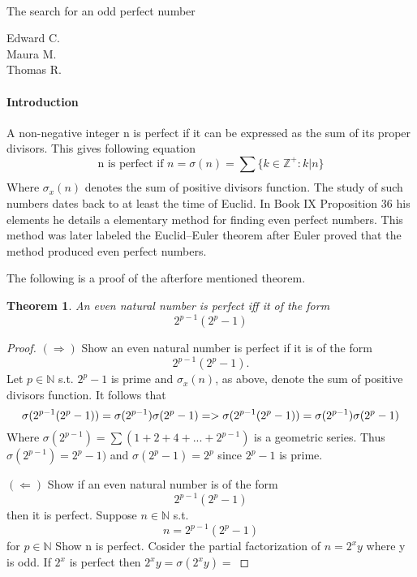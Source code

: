 \\\documentclass[12pt]{article}
\newtheorem{theorem}{Theorem}
\begin{document}
\begin{center}
	\Large
	The search for an odd perfect number
\end{center}

\begin{flushright}
	Edward C.\\
	\vspace{2 mm}
	Maura M.\\
	\vspace{2 mm}
	Thomas R.\\
\end{flushright}

\paragraph*{Introduction}
	A non-negative integer n is perfect if it can be expressed as the sum of its proper divisors. This gives following equation 
	$$\text{n is perfect if } n = \sigma(n) = \sum_{}{}\{k \in \mathbb{Z}^+ : k|n\}$$  Where $\sigma_x (n)$ 
	denotes the sum of positive divisors function.  The study of such numbers dates back to at least the 
	time of Euclid. In Book IX Proposition 36 his elements he details a elementary method for finding even
	perfect numbers.  This method was later labeled the Euclid–Euler theorem
	after Euler proved that the method produced even perfect numbers.
	
	The following is a proof of the afterfore mentioned theorem.
	
	\begin{theorem}
		An even natural number is perfect iff it of the form $$2^{p-1} (2^{p} - 1)$$
	\end{theorem}
	
	\begin{proof}
		$(\Rightarrow)$
			Show an even natural number is perfect if it is of the form  $$2^{p-1} (2^{p} - 1).$$
			Let $p \in \mathbb{N}$ s.t. $2^{p}-1$ is prime and $\sigma_x (n)$, as above, denote the sum of positive divisors function.
			It follows that $$\sigma (2^{p-1}(2^{p}-1))=\sigma (2^{p-1})\sigma (2^{p}-1) \newline =>
			\sigma (2^{p-1}(2^{p}-1))=\sigma (2^{p-1})\sigma (2^{p}-1)$$
			Where $\sigma (2^{p-1}) = \sum{}{}(1 + 2 + 4 + ... + 2^{p-1})$ is a geometric series.\newline
			Thus $\sigma (2^{p-1}) = 2^{p}-1)$ and $\sigma (2^{p}-1) = 2^{p}$ since $2^{p}-1$ is prime.
		
		$(\Leftarrow)$
			Show if an even natural number is of the form  $$2^{p-1} (2^{p} - 1)$$ then it is perfect.
			Suppose $n \in \mathbb{N}$ s.t. $$n = 2^{p-1} (2^{p} - 1)$$ for $p \in \mathbb{N}$
			Show n is perfect.
			Cosider the partial factorization of $n = 2^{x}y$ where y is odd.
			If $2^{x}$ is perfect then $2^{x}y = \sigma (2^{x}y) = $
 
	\end{proof}
\end{document}
